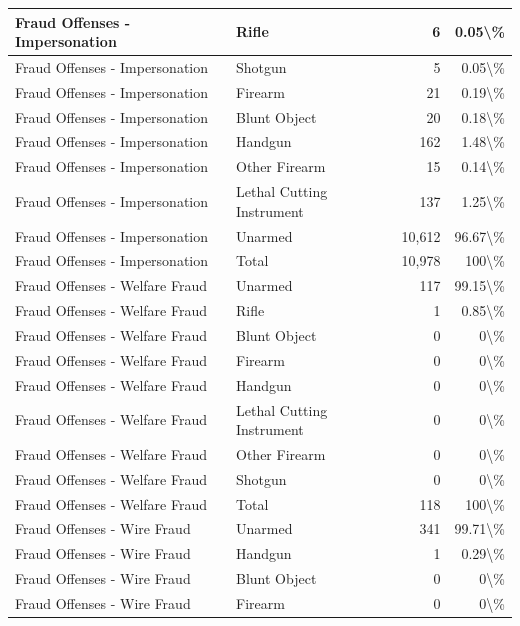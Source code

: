 \documentclass[
]{krantz}
\begin{document}
\begin{longtable}[t]{l|l|r|r}
\hline
Fraud Offenses - Impersonation & Rifle & 6 & 0.05\textbackslash{}\%\\
\hline
Fraud Offenses - Impersonation & Shotgun & 5 & 0.05\textbackslash{}\%\\
\hline
Fraud Offenses - Impersonation & Firearm & 21 & 0.19\textbackslash{}\%\\
\hline
Fraud Offenses - Impersonation & Blunt Object & 20 & 0.18\textbackslash{}\%\\
\hline
Fraud Offenses - Impersonation & Handgun & 162 & 1.48\textbackslash{}\%\\
\hline
Fraud Offenses - Impersonation & Other Firearm & 15 & 0.14\textbackslash{}\%\\
\hline
Fraud Offenses - Impersonation & Lethal Cutting Instrument & 137 & 1.25\textbackslash{}\%\\
\hline
Fraud Offenses - Impersonation & Unarmed & 10,612 & 96.67\textbackslash{}\%\\
\hline
Fraud Offenses - Impersonation & Total & 10,978 & 100\textbackslash{}\%\\
\hline
Fraud Offenses - Welfare Fraud & Unarmed & 117 & 99.15\textbackslash{}\%\\
\hline
Fraud Offenses - Welfare Fraud & Rifle & 1 & 0.85\textbackslash{}\%\\
\hline
Fraud Offenses - Welfare Fraud & Blunt Object & 0 & 0\textbackslash{}\%\\
\hline
Fraud Offenses - Welfare Fraud & Firearm & 0 & 0\textbackslash{}\%\\
\hline
Fraud Offenses - Welfare Fraud & Handgun & 0 & 0\textbackslash{}\%\\
\hline
Fraud Offenses - Welfare Fraud & Lethal Cutting Instrument & 0 & 0\textbackslash{}\%\\
\hline
Fraud Offenses - Welfare Fraud & Other Firearm & 0 & 0\textbackslash{}\%\\
\hline
Fraud Offenses - Welfare Fraud & Shotgun & 0 & 0\textbackslash{}\%\\
\hline
Fraud Offenses - Welfare Fraud & Total & 118 & 100\textbackslash{}\%\\
\hline
Fraud Offenses - Wire Fraud & Unarmed & 341 & 99.71\textbackslash{}\%\\
\hline
Fraud Offenses - Wire Fraud & Handgun & 1 & 0.29\textbackslash{}\%\\
\hline
Fraud Offenses - Wire Fraud & Blunt Object & 0 & 0\textbackslash{}\%\\
\hline
Fraud Offenses - Wire Fraud & Firearm & 0 & 0\textbackslash{}\%\\

\end{longtable}
\end{document}
